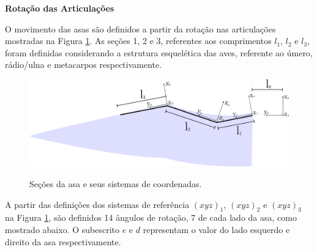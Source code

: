 \documentclass[10pt,a4paper]{report}
\begin{document}
\textbf{Rotação das Articulações}

O movimento das asas são definidos a partir da rotação nas articulações mostradas na Figura \ref{fig:geo_wing_sections_rotation}. As seções 1, 2 e 3, referentes aos comprimentos {$l_{1}$}, {$l_{2}$} e {$l_{3}$}, foram definidas considerando a estrutura esquelética das aves, referente ao úmero, rádio/ulna e metacarpos respectivamente.

\begin{figure}[h!]
	\centering
	\caption{Seções da asa e seus sistemas de coordenadas.}
	\includegraphics[width=1.0\textwidth]{figures/geo_wing_sections_rotation.png}
	\label{fig:geo_wing_sections_rotation}
\end{figure}

A partir das definições dos sistemas de referência {$(xyz)_{1}$}, {$(xyz)_{2}$} e {$(xyz)_{3}$} na Figura \ref{fig:geo_wing_sections_rotation}, são definidos 14 ângulos de rotação, 7 de cada lado da asa, como mostrado abaixo. O subescrito {$e$} e {$d$} representam o valor do lado esquerdo e direito da asa respectivamente.
\end{document}

